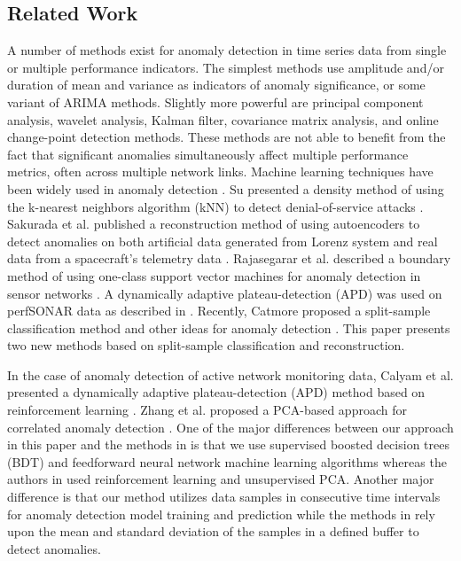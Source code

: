 \documentclass[5p]{elsarticle}
\begin{document}
\subsection{Related Work}

A number of methods exist for anomaly detection in time series data from single or multiple performance indicators. The simplest methods use amplitude and/or duration of mean and variance as indicators of anomaly significance, or some variant of ARIMA methods. Slightly more powerful are principal component analysis, wavelet analysis, Kalman filter, covariance matrix analysis, and online change-point detection methods. These methods are not able to benefit from the fact that significant anomalies simultaneously affect multiple performance metrics, often across multiple network links. Machine learning techniques have been widely used in anomaly detection \cite{two}. Su presented a density method of using the k-nearest neighbors algorithm (kNN) to detect denial-of-service attacks \cite{three}. Sakurada et al. published a reconstruction method of using autoencoders to detect anomalies on both artificial data generated from Lorenz system and real data from a spacecraft’s telemetry data \cite{four}. Rajasegarar et al. described a boundary method of using one-class support vector machines for anomaly detection in sensor networks \cite{five}. A dynamically adaptive plateau-detection (APD) was used on perfSONAR data as described in \cite{seven}. Recently, Catmore proposed a split-sample classification method and other ideas for anomaly detection \cite{six}. This paper presents two new methods based on split-sample classification and reconstruction. 

In the case of anomaly detection of active network monitoring data, Calyam et al. presented a dynamically adaptive plateau-detection (APD) method based on reinforcement learning \cite{eight} \cite{nine}. Zhang et al. proposed a PCA-based approach for correlated anomaly detection \cite{ten}. One of the major differences between our approach in this paper and the methods in \cite{eight} \cite{nine} \cite{ten} is that we use supervised boosted decision trees (BDT) and feedforward neural network machine learning algorithms whereas the authors in \cite{eight} \cite{nine} \cite{ten} used reinforcement learning and unsupervised PCA. Another major difference is that our method utilizes data samples in consecutive time intervals for anomaly detection model training and prediction while the methods in \cite{eight} \cite{nine} rely upon the mean and standard deviation of the samples in a defined buffer to detect anomalies.
\end{document}
